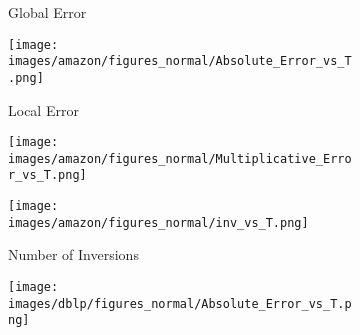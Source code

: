 
%
\begin{figure*}[htbp]
	\centering
	\begin{subfigure}[b]{\textwidth}
		\centering
	\begin{minipage}[b]{0.05\textwidth}
		\centering
	\end{minipage}%
	\begin{minipage}[b]{0.3\textwidth}
		\centering
		\caption*{Global Error} %
		\texttt{[image: images/amazon/figures\_normal/Absolute\_Error\_vs\_T.png]} %
		
	\end{minipage}%
	\begin{minipage}[b]{0.3\textwidth}
		\centering
		\caption*{Local Error} %
		\texttt{[image: images/amazon/figures\_normal/Multiplicative\_Error\_vs\_T.png]} %
		
	\end{minipage}%
	\begin{minipage}[b]{0.3\textwidth}
		\centering
		\caption*{Number of Inversions} %
		\texttt{[image: images/amazon/figures\_normal/inv\_vs\_T.png]} %
	\end{minipage}
\end{subfigure}
	\begin{subfigure}[b]{\textwidth}
	\centering
	\begin{minipage}[b]{0.05\textwidth}
		\centering
	\end{minipage}%
	\begin{minipage}[b]{0.3\textwidth}
		\centering
		\texttt{[image: images/dblp/figures\_normal/Absolute\_Error\_vs\_T.png]} %
		

\end{minipage}
\end{subfigure}
\end{figure*}
